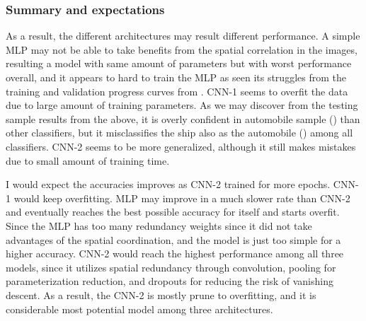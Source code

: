 \documentclass{tron}
\begin{document}
\subsubsection{Summary and expectations}
As a result, the different architectures may result different performance. A simple MLP may not be able to take benefits from the spatial correlation in the images, resulting a model with same amount of parameters but with worst performance overall, and it appears to hard to train the MLP as seen its struggles from the training and validation progress curves from . CNN-1 seems to overfit the data due to large amount of training parameters. As we may discover from the testing sample results from the above, it is overly confident in automobile sample () than other classifiers, but it misclassifies the ship also as the automobile () among all classifiers. CNN-2 seems to be more generalized, although it still makes mistakes due to small amount of training time.

I would expect the accuracies improves as CNN-2 trained for more epochs. CNN-1 would keep overfitting. MLP may improve in a much slower rate than CNN-2 and eventually reaches the best possible accuracy for itself and starts overfit. Since the MLP has too many redundancy weights since it did not take advantages of the spatial coordination, and the model is just too simple for a higher accuracy. CNN-2 would reach the highest performance among all three models, since it utilizes spatial redundancy through convolution, pooling for parameterization reduction, and dropouts for reducing the risk of vanishing descent. As a result, the CNN-2 is mostly prune to overfitting, and it is considerable most potential model among three architectures.



\end{document}
